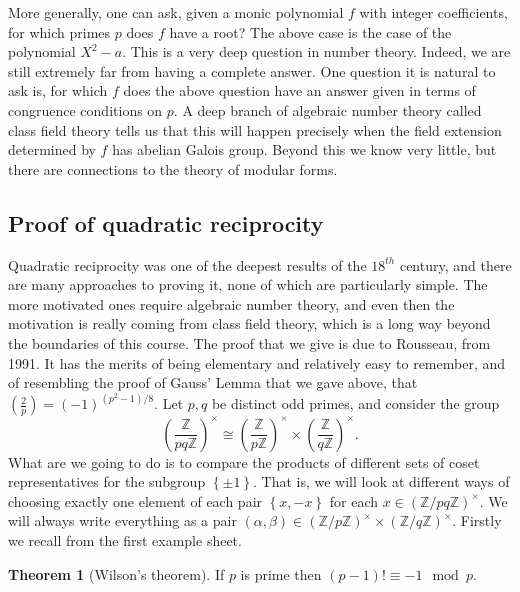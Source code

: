 \documentclass{article}
\newcommand{\Z}{\mathbb{Z}}
\newcommand{\rb}[1]{\left( #1 \right)}
\newcommand{\cb}[1]{\left\{ #1 \right\}}
\newcommand{\unit}[1]{\rb{\Z / #1\Z}^\times}
\newcommand{\legendre}[2]{\rb{\tfrac{#1}{#2}}}
\theoremstyle{definition}\newtheorem{definition}{Definition}
\theoremstyle{definition}\newtheorem{remark}[definition]{Remark}
\theoremstyle{definition}\newtheorem*{example}{Example}
\theoremstyle{definition}\newtheorem*{note}{Note}
\newtheorem{theorem}[definition]{Theorem}
\begin{document}
More generally, one can ask, given a monic polynomial $ f $ with integer coefficients, for which primes $ p $ does $ f $ have a root? The above case is the case of the polynomial $ X^2 - a $. This is a very deep question in number theory. Indeed, we are still extremely far from having a complete answer. One question it is natural to ask is, for which $ f $ does the above question have an answer given in terms of congruence conditions on $ p $. A deep branch of algebraic number theory called class field theory tells us that this will happen precisely when the field extension determined by $ f $ has abelian Galois group. Beyond this we know very little, but there are connections to the theory of modular forms.


\subsection{Proof of quadratic reciprocity}

Quadratic reciprocity was one of the deepest results of the $ 18^{th} $ century, and there are many approaches to proving it, none of which are particularly simple. The more motivated ones require algebraic number theory, and even then the motivation is really coming from class field theory, which is a long way beyond the boundaries of this course. The proof that we give is due to Rousseau, from 1991. It has the merits of being elementary and relatively easy to remember, and of resembling the proof of Gauss' Lemma that we gave above, that $ \legendre{2}{p} = \rb{-1}^{\rb{p^2 - 1} / 8} $. Let $ p, q $ be distinct odd primes, and consider the group
$$ \rb{\dfrac{\Z}{pq\Z}}^\times \cong \rb{\dfrac{\Z}{p\Z}}^\times \times \rb{\dfrac{\Z}{q\Z}}^\times. $$
What are we going to do is to compare the products of different sets of coset representatives for the subgroup $ \cb{\pm 1} $. That is, we will look at different ways of choosing exactly one element of each pair $ \cb{x, -x} $ for each $ x \in \unit{pq} $. We will always write everything as a pair $ \rb{\alpha, \beta} \in \unit{p} \times \unit{q} $. Firstly we recall from the first example sheet.

\begin{theorem}[Wilson's theorem]
If $ p $ is prime then $ \rb{p - 1}! \equiv -1 \mod p $.
\end{theorem}
\end{document}
